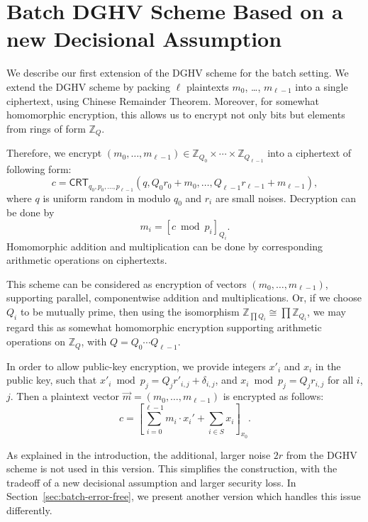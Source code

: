 \documentclass[11pt]{llncs}
\newcommand{\Z}{{\mathbb Z}}
\newcommand*{\crt}{\ensuremath{\mathsf{CRT}}}
\begin{document}
\section{Batch DGHV Scheme Based on a new Decisional Assumption}\label{sec:batch-decisional}

%

We describe our first extension of the DGHV scheme for the batch setting.  We extend the DGHV scheme
by packing $\ell$ plaintexts $m_0$, \dots, $m_{\ell-1}$ into a single ciphertext, using Chinese Remainder
Theorem.  Moreover, for somewhat homomorphic encryption, this allows us to encrypt not only bits
but elements from rings of form $\Z_Q$.

Therefore, we encrypt $(m_0, \dots, m_{\ell-1})\in\Z_{Q_0}\times\cdots\times\Z_{Q_{\ell-1}}$ into a ciphertext
of following form:
\[
c=\crt_{q_0,p_0,\ldots,p_{\ell-1}}(q, Q_0 r_0+m_0,\ldots,Q_{\ell-1}r_{\ell-1}+m_{\ell-1}),
\]
where $q$ is uniform random in modulo $q_0$ and $r_i$ are small noises.  Decryption can be done by
\[
m_i=[c\bmod{p_i}]_{Q_i}.
\]
Homomorphic addition and multiplication can be done by corresponding arithmetic operations on ciphertexts.

This scheme can be considered as encryption of vectors $(m_0, \dots, m_{\ell-1})$, supporting parallel, componentwise
addition and multiplications.  Or, if we choose $Q_i$ to be mutually prime, then using the isomorphism 
$\Z_{\prod Q_i}\cong\prod\Z_{Q_i}$, we may regard this as somewhat homomorphic encryption supporting arithmetic operations
on $\Z_Q$, with $Q=Q_0\cdots Q_{\ell-1}$.

In order to allow public-key encryption, we provide integers $x'_i$ and $x_i$ in the public key, such that $x'_i\bmod{p_j}=Q_{j}r'_{i,j}+\delta_{i,j}$, and $x_i\bmod{p_j}=Q_{j}r_{i,j}$ for all $i$, $j$.  Then a plaintext vector $\vec{m}=(m_0, \dots, m_{\ell-1})$ is encrypted as follows:
\[
c=\left[\sum_{i=0}^{\ell-1}m_i\cdot x_i'+\sum_{i\in S} x_i\right]_{x_0}.
\]

As explained in the introduction, the additional, larger noise $2r$ from the DGHV scheme is not used in this version.
This simplifies the construction, with the tradeoff of a new decisional assumption and larger security loss.  
In Section~\ref{sec:batch-error-free}, we present another version which handles this issue differently.
\end{document}
